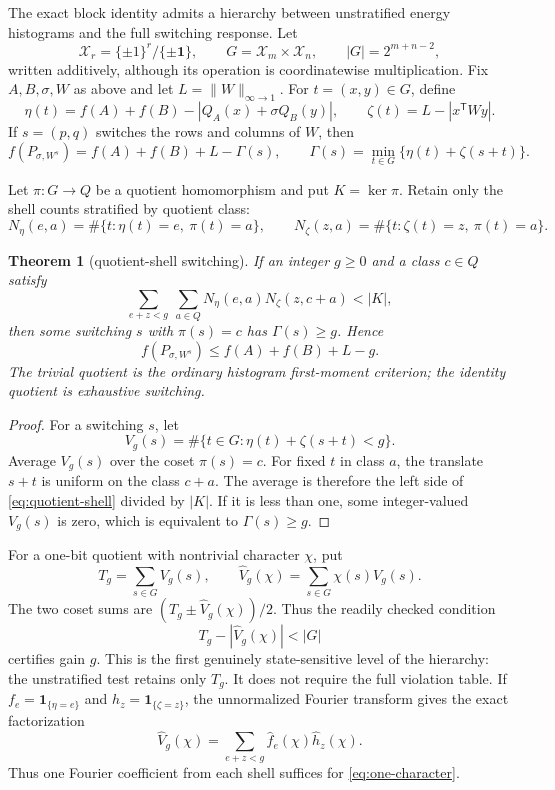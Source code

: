 \documentclass[11pt]{article}
\newtheorem{theorem}{Theorem}[section]
\theoremstyle{definition}
\theoremstyle{remark}
\begin{document}
The exact block identity admits a hierarchy between unstratified energy
histograms and the full switching response.  Let
\[
 \mathcal X_r=\{\pm1\}^r/\{\pm\mathbf1\},
 \qquad G=\mathcal X_m\times\mathcal X_n,
 \qquad |G|=2^{m+n-2},
\]
written additively, although its operation is coordinatewise multiplication.
Fix $A,B,\sigma,W$ as above and let $L=\|W\|_{\infty\to1}$.  For
$t=(x,y)\in G$, define
\[
 \eta(t)=f(A)+f(B)-|Q_A(x)+\sigma Q_B(y)|,
 \qquad
 \zeta(t)=L-|x^{\mathsf T}Wy|.
\]
If $s=(p,q)$ switches the rows and columns of $W$, then
\begin{equation}\label{eq:switching-gain}
 f(P_{\sigma,W^s})=f(A)+f(B)+L-\Gamma(s),
 \qquad
 \Gamma(s)=\min_{t\in G}\{\eta(t)+\zeta(s+t)\}.
\end{equation}

Let $\pi:G\to Q$ be a quotient homomorphism and put $K=\ker\pi$.  Retain
only the shell counts stratified by quotient class:
\[
 N_\eta(e,a)=\#\{t:\eta(t)=e,\ \pi(t)=a\},
 \qquad
 N_\zeta(z,a)=\#\{t:\zeta(t)=z,\ \pi(t)=a\}.
\]

\begin{theorem}[quotient-shell switching]\label{thm:quotient-shell}
If an integer $g\ge0$ and a class $c\in Q$ satisfy
\begin{equation}\label{eq:quotient-shell}
 \sum_{e+z<g}\ \sum_{a\in Q}
 N_\eta(e,a)N_\zeta(z,c+a)<|K|,
\end{equation}
then some switching $s$ with $\pi(s)=c$ has $\Gamma(s)\ge g$.  Hence
\[
 f(P_{\sigma,W^s})\le f(A)+f(B)+L-g.
\]
The trivial quotient is the ordinary histogram first-moment criterion; the
identity quotient is exhaustive switching.
\end{theorem}

\begin{proof}
For a switching $s$, let
\[
 V_g(s)=\#\{t\in G:\eta(t)+\zeta(s+t)<g\}.
\]
Average $V_g(s)$ over the coset $\pi(s)=c$.  For fixed $t$ in class $a$,
the translate $s+t$ is uniform on the class $c+a$.  The average is therefore
the left side of \eqref{eq:quotient-shell} divided by $|K|$.  If it is less
than one, some integer-valued $V_g(s)$ is zero, which is equivalent to
$\Gamma(s)\ge g$.
\end{proof}

For a one-bit quotient with nontrivial character $\chi$, put
\[
 T_g=\sum_{s\in G}V_g(s),
 \qquad \widehat V_g(\chi)=\sum_{s\in G}\chi(s)V_g(s).
\]
The two coset sums are
$(T_g\pm\widehat V_g(\chi))/2$.  Thus the readily checked condition
\begin{equation}\label{eq:one-character}
 T_g-|\widehat V_g(\chi)|<|G|
\end{equation}
certifies gain $g$.  This is the first genuinely state-sensitive level of
the hierarchy: the unstratified test retains only $T_g$.  It does not require
the full violation table.  If $f_e=\mathbf1_{\{\eta=e\}}$ and
$h_z=\mathbf1_{\{\zeta=z\}}$, the unnormalized Fourier transform gives the
exact factorization
\[
 \widehat V_g(\chi)=
 \sum_{e+z<g}\widehat f_e(\chi)\widehat h_z(\chi).
\]
Thus one Fourier coefficient from each shell suffices for
\eqref{eq:one-character}.
\end{document}
